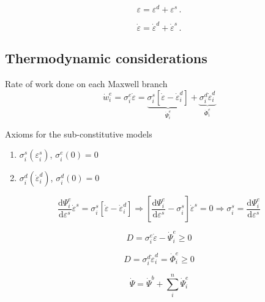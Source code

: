 \documentclass[12pt]{article}
\newcommand{\der}[2]{\dfrac{\text{d} #1}{\text{d} #2}}
\begin{document}
\begin{equation}
		\varepsilon = \varepsilon^{d} + \varepsilon^{s}\,.
\end{equation}

\begin{equation}
	\dot{\varepsilon } = \dot{\varepsilon}^{d} + \dot{\varepsilon}^{s}\,.
\end{equation}

\subsection{Thermodynamic considerations}


Rate of work done on each Maxwell branch
\begin{equation}
	\dot{w}^{e}_{i} = \sigma^{e}_{i}\dot{\varepsilon} = \underbrace{\sigma^{s}_{i}\left[\dot{\varepsilon}-\dot{\varepsilon}_{i}^{d}\right]}_{\dot{\Psi}^{e}_{i}} + \underbrace{\sigma^{d}_{i}\dot{\varepsilon}_{i}^{d}}_{\dot{\Phi}^{e}_{i}}
\end{equation}

Axioms for the sub-constitutive models
\begin{enumerate}
	\item $\sigma^{s}_{i}(\varepsilon^{s}_{i})$, $\sigma^{e}_{i}(0) = 0$
	\item $\sigma^{d}_{i}\left(\dot{\varepsilon}^{d}_{i}\right)$,  $\sigma^{d}_{i}\left(0\right) = 0$ 
\end{enumerate}

\begin{equation}
	\der{\Psi^{e}_{i}}{\varepsilon^{s}}\dot{\varepsilon}^{s} = \sigma^{s}_{i}\left[\dot{\varepsilon}-\dot{\varepsilon}_{i}^{d}\right] \Rightarrow \left[\der{\Psi^{e}_{i}}{\varepsilon^{s}} - \sigma^{s}_{i}\right]\dot{\varepsilon}^{s} = 0 \Rightarrow \sigma^{s}_{i} = \der{\Psi^{e}_{i}}{\varepsilon^{s}}
\end{equation}

\begin{equation}
	D = \sigma^{e}_{i}\dot{\varepsilon} - \dot{\Psi}^{e}_{i} \geq 0 
\end{equation}

\begin{equation}
	D = \sigma^{d}_{i}\dot{\varepsilon}_{i}^{d} = \dot{\Phi}^{e}_{i} \geq 0 
\end{equation}

\begin{equation}
	\dot{\Psi} = \dot{\Psi}^{b} + \sum_{i}^{n}  \dot{\Psi}^{e}_{i}
\end{equation}
\end{document}
